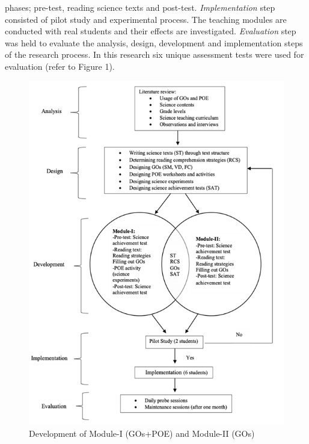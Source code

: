 \documentclass[11.5pt]{sig-alternate} %
\begin{document}
\begin{large}
phases; pre-test, reading science texts and post-test. \textit{Implementation} step consisted of pilot study and experimental process. The teaching modules are conducted with real students and their effects are investigated. \textit{Evaluation} step was held to evaluate the analysis, design, development and implementation steps of the research process. In this research six unique assessment tests were used for evaluation (refer to Figure 1).

\begin{figure}[ht]
    \includegraphics[width=\linewidth]{images/fig1.png}
    \caption{Development of Module-I (GOs+POE) and Module-II (GOs)}
\end{figure}


\end{large}
\end{document}
